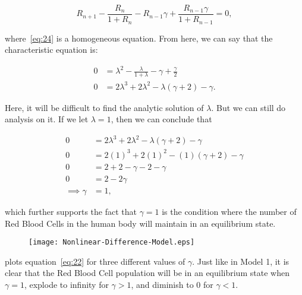 \begin{equation}
    R_{n+1} - \frac{R_n}{1 + R_n} - R_{n-1}\gamma + \frac{R_{n-1}\gamma}{1+R_{n-1}} = 0,
    \label{eq:24}
\end{equation}

where~\eqref{eq:24} is a homogeneous equation. From here, we can say that the characteristic equation is:

\begin{align}
    0 &= \lambda^2 - \frac{\lambda}{1 + \lambda} - \gamma + \frac{\gamma}{2} \nonumber\\
    0 &= 2\lambda^3+2\lambda^2-\lambda(\gamma+2)-\gamma. \label{eq:25}
\end{align}

Here, it will be difficult to find the analytic solution of $\lambda$. But we can still do analysis on it. If we let $\lambda = 1$, then we can conclude that

\begin{align}
    0 &= 2\lambda^3 + 2\lambda^2 - \lambda(\gamma + 2) - \gamma \nonumber\\
    0 &= 2(1)^3 + 2(1)^2 - (1)(\gamma+2) - \gamma \nonumber\\
    0 &= 2 + 2 - \gamma - 2 - \gamma \nonumber\\
    0 &= 2 - 2\gamma \nonumber\\
    \implies \gamma &= 1, \label{eq:26}
\end{align}

which further supports the fact that $\gamma = 1$ is the condition where the number of Red Blood Cells in the human body will maintain in an equilibrium state.

\begin{figure}[H] 
    \centering
    \texttt{[image: Nonlinear-Difference-Model.eps]}
    \caption{}
    \label{fig:2}
\end{figure}

 plots equation~\eqref{eq:22} for three different values of $\gamma$. Just like in Model 1, it is clear that the Red Blood Cell population will be in an equilibrium state when $\gamma = 1$, explode to infinity for $\gamma > 1$, and diminish to 0 for $\gamma < 1$.
